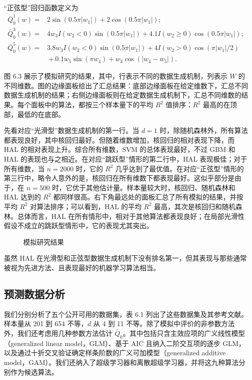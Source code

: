 “正弦型”回归函数定义为
\[
 \begin{aligned}
 \bar Q_0^1(w)={}&2\sin(0.5\pi|w_1|)+2\cos(0.5\pi|w_1|);\\
 \bar Q_0^3(w)={}&4w_3I(w_2<0)\sin(0.5\pi|w_1|)
                    +4.1I(w_2\geq0)\cos(0.5\pi|w_1|);\\
 \bar Q_0^5(w)={}&3.8w_3I(w_2<0)\sin(0.5\pi|w_1|)
                    +4I(w_2>0)\cos(\pi|w_1|/2)\\
                &{}+0.1w_5\sin(\pi w_4)+w_3\cos(|w_4-w_5|).
 \end{aligned}
\]

图 6.3 展示了模拟研究的结果，其中，行表示不同的数据生成机制，列表示 $W$ 的不同维数。图的边缘面板给出了汇总结果：底部边缘面板在给定维数下，汇总不同数据生成机制的结果；右侧边缘面板则在给定数据生成机制下，汇总不同维数的结果。每个面板中的算法，都按三个样本量下的平均 $R^2$ 值排序：$R^2$ 最高的在顶部，最低的在底部。

先看对应“光滑型”数据生成机制的第一行。当 $d=1$ 时，除随机森林外，所有算法都表现良好，其中核回归最好。但随着维数增加，核回归的相对表现下降，而 HAL 的相对表现上升。综合所有维数，SVM 的总体表现最好，不过 GBM 和 HAL 的表现也与之相近。在对应“跳跃型”情形的第二行中，HAL 表现极佳；对于所有维数，当 $n=2000$ 时，它的 $R^2$ 几乎达到了最优值。在对应“正弦型”情形的第三行中，略令人意外的是，核回归在所有维数下都表现最好。这似乎部分是由于，在 $n=500$ 时，它优于其他估计量。样本量较大时，核回归、随机森林和 HAL 达到的 $R^2$ 都同样很高。右下角最远处的面板汇总了所有模拟的结果，并按平均 $R^2$ 对算法排序；可以看到，HAL 的平均 $R^2$ 最高，其次是核回归和随机森林。总体而言，HAL 在所有情形中，相对于其他算法都表现良好；在局部光滑性假设不成立的跳跃型情形中，它的表现尤其突出。

\begin{landscape}
\begin{figure}[p]
 \centering
 
 \caption{模拟研究结果}
 \label{fig:ch06-prediction-simulation}
\end{figure}
\end{landscape}
\FloatBarrier

虽然 HAL 在光滑型和正弦型数据生成机制下没有排名第一，但其表现与那些通常被视为先进方法、且表现最好的机器学习算法相当。

\subsection{预测数据分析}
\label{subsec:ch06-prediction-analysis}

我们分别分析了五个公开可用的数据集，表 6.1 列出了这些数据集及其参考文献。样本量从 201 到 654 不等，$d$ 从 4 到 11 不等。除了模拟中评价的非参数方法外，我们还考虑用几种参数方法估计 $\bar Q_0$。其中包括只含主效应项的广义线性模型（generalized linear model，GLM）、基于 AIC 且纳入二阶交互项的逐步 GLM，以及通过十折交叉验证确定样条阶数的广义可加模型（generalized additive model，GAM）。我们还纳入了超级学习器和离散超级学习器，并将这九种算法分别作为候选算法。

